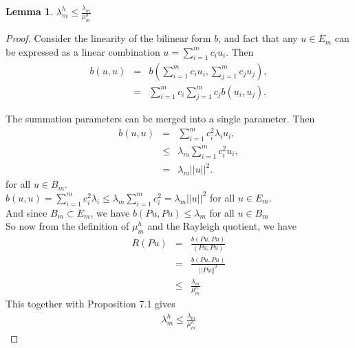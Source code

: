 \documentclass[../../main.tex]{subfiles}
\begin{document}
\newtheorem{Lem_1}{Lemma}
\begin{Lem_1}
	$\displaystyle \lambda_{m}^{h} \leq \frac{\lambda_{m}}{\mu_{m}^{h}}$
\end{Lem_1}
\begin{proof}
	Consider the linearity of the bilinear form $b$, and fact that any $u \in E_m$ can be expressed as a linear combination $u = \sum_{i=1}^{m} c_{i}u_{i}$. Then
	\begin{eqnarray*}
	b(u,u) &=& b\left(\sum_{i=1}^{m} c_{i}u_{i},\sum_{j=1}^{m} c_{j}u_{j}\right),\\
			&=& \sum_{i=1}^{m} c_{i}\sum_{j=1}^{m} c_{j} b(u_{i},u_{j}).
	\end{eqnarray*}

	The summation parameters can be merged into a single parameter. Then
	\begin{eqnarray*}
		b(u,u)  & = & \sum_{i=1}^{m} c_{i}^{2} \lambda_{i} u_i,\\
				& \leq & \lambda_{m}\sum_{i=1}^{m} c_{i}^{2} u_i,\\
				& = & \lambda_{m}||u||^2.
	\end{eqnarray*} for all $u \in B_m$.\\
	
	
	$b(u,u) = \sum_{i=1}^{m} c_{i}^{2} \lambda_{i} \leq \lambda_{m}\sum_{i=1}^{m} c_{i}^{2} =\lambda_{m} ||u||^{2}$ for all $u \in E_{m}$.\\
	And since $B_{m} \subset E_{m}$, we have $b(Pu,Pu) \leq \lambda_{m}$ for all $u\in B_{m}$\\
	
	
	So now from the definition of $\mu_{m}^{h}$ and the Rayleigh quotient, we have
	\begin{eqnarray*}
		R(Pu) &=& \frac{b(Pu,Pu)}{(Pu,Pu)}\\
			&=& \frac{b(Pu,Pu)}{||Pu||^{2}}\\
			&\leq & \frac{\lambda_{m}}{\mu_{m}^{h}}
	\end{eqnarray*}
	This together with Proposition 7.1 gives
	\begin{eqnarray*}
		\lambda_{m}^{h} \leq \frac{\lambda_{m}}{\mu_{m}^{h}}
	\end{eqnarray*}
\end{proof}
\end{document}
